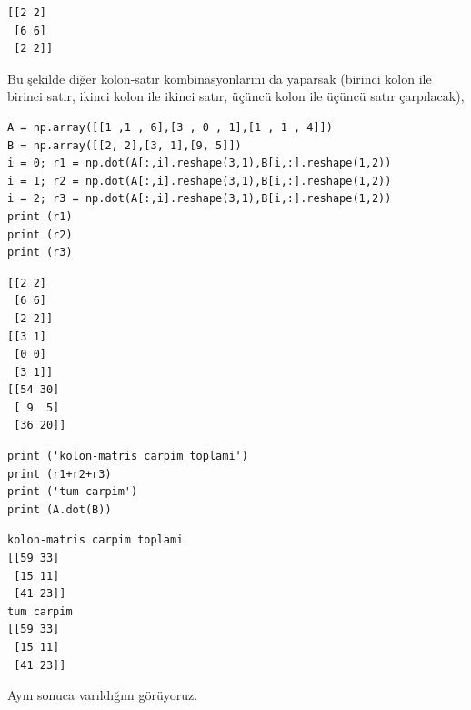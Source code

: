 \documentclass[12pt,fleqn]{article}\usepackage{../../common}
\begin{document}
\begin{verbatim}
[[2 2]
 [6 6]
 [2 2]]
\end{verbatim}

Bu şekilde diğer kolon-satır kombinasyonlarını da yaparsak (birinci kolon ile
birinci satır, ikinci kolon ile ikinci satır, üçüncü kolon ile üçüncü satır
çarpılacak),

\begin{verbatim}
A = np.array([[1 ,1 , 6],[3 , 0 , 1],[1 , 1 , 4]])
B = np.array([[2, 2],[3, 1],[9, 5]])
i = 0; r1 = np.dot(A[:,i].reshape(3,1),B[i,:].reshape(1,2))
i = 1; r2 = np.dot(A[:,i].reshape(3,1),B[i,:].reshape(1,2))
i = 2; r3 = np.dot(A[:,i].reshape(3,1),B[i,:].reshape(1,2))
print (r1)
print (r2)
print (r3)
\end{verbatim}

\begin{verbatim}
[[2 2]
 [6 6]
 [2 2]]
[[3 1]
 [0 0]
 [3 1]]
[[54 30]
 [ 9  5]
 [36 20]]
\end{verbatim}

\begin{verbatim}
print ('kolon-matris carpim toplami')
print (r1+r2+r3)
print ('tum carpim')
print (A.dot(B))
\end{verbatim}

\begin{verbatim}
kolon-matris carpim toplami
[[59 33]
 [15 11]
 [41 23]]
tum carpim
[[59 33]
 [15 11]
 [41 23]]
\end{verbatim}

Aynı sonuca varıldığını görüyoruz.
\end{document}
